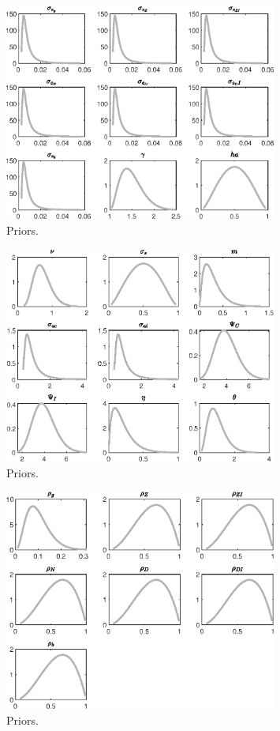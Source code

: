  
\begin{figure}[H]
\centering
\includegraphics[width=0.80\textwidth]{BRS_gen/graphs/BRS_gen_Priors1}
\caption{Priors.}\label{Fig:Priors:1}
\end{figure}
\begin{figure}[H]
\centering
\includegraphics[width=0.80\textwidth]{BRS_gen/graphs/BRS_gen_Priors2}
\caption{Priors.}\label{Fig:Priors:2}
\end{figure}
\begin{figure}[H]
\centering
\includegraphics[width=0.80\textwidth]{BRS_gen/graphs/BRS_gen_Priors3}
\caption{Priors.}\label{Fig:Priors:3}
\end{figure}
 
